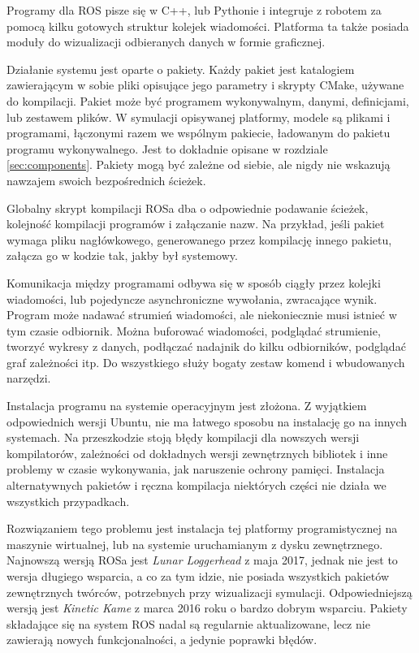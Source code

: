 	Programy dla ROS pisze się w C++, lub Pythonie i integruje z robotem za pomocą kilku gotowych struktur kolejek wiadomości.
	Platforma ta także posiada moduły do wizualizacji odbieranych danych w formie graficznej.

	Działanie systemu jest oparte o pakiety.
	Każdy pakiet jest katalogiem zawierającym w sobie pliki opisujące jego parametry i skrypty CMake, używane do kompilacji.
	Pakiet może być programem wykonywalnym, danymi, definicjami, lub zestawem plików.
	W symulacji opisywanej platformy, modele są plikami i programami, łączonymi razem we wspólnym pakiecie, ładowanym do pakietu programu wykonywalnego.
	Jest to dokładnie opisane w rozdziale \ref{sec:components}.
	Pakiety mogą być zależne od siebie, ale nigdy nie wskazują nawzajem swoich bezpośrednich ścieżek.

	Globalny skrypt kompilacji ROSa dba o odpowiednie podawanie ścieżek, kolejność kompilacji programów i załączanie nazw.
	Na przykład, jeśli pakiet wymaga pliku nagłówkowego, generowanego przez kompilację innego pakietu, załącza go w kodzie tak, jakby był systemowy.

	Komunikacja między programami odbywa się w sposób ciągły przez kolejki wiadomości, lub pojedyncze asynchroniczne wywołania, zwracające wynik.
	Program może nadawać strumień wiadomości, ale niekoniecznie musi istnieć w tym czasie odbiornik.
	Można buforować wiadomości, podglądać strumienie, tworzyć wykresy z danych, podłączać nadajnik do kilku odbiorników, podglądać graf zależności itp.
	Do wszystkiego służy bogaty zestaw komend i wbudowanych narzędzi.

	Instalacja programu na systemie operacyjnym jest złożona.
	Z wyjątkiem odpowiednich wersji Ubuntu, nie ma łatwego sposobu na instalację go na innych systemach.
	Na przeszkodzie stoją błędy kompilacji dla nowszych wersji kompilatorów, zależności od dokładnych wersji zewnętrznych bibliotek i 
	inne problemy w czasie wykonywania, jak naruszenie ochrony pamięci. 
	Instalacja alternatywnych pakietów i ręczna kompilacja niektórych części nie działa we wszystkich przypadkach.

	Rozwiązaniem tego problemu jest instalacja tej platformy programistycznej na maszynie wirtualnej, lub na systemie uruchamianym z dysku zewnętrznego. 
	Najnowszą wersją ROSa jest \emph{Lunar Loggerhead} z maja 2017, jednak nie jest to wersja długiego wsparcia, a co za tym idzie, nie posiada wszystkich
	pakietów zewnętrznych twórców, potrzebnych przy wizualizacji symulacji.
	Odpowiedniejszą wersją jest \emph{Kinetic Kame} z marca 2016 roku o bardzo dobrym wsparciu.
	Pakiety składające się na system ROS nadal są regularnie aktualizowane, lecz nie zawierają nowych funkcjonalności, a jedynie poprawki błędów.

